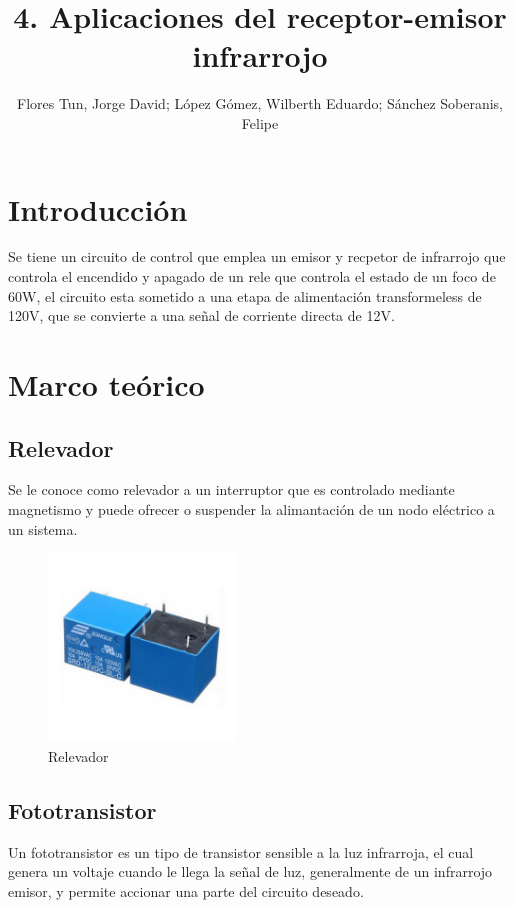 \documentclass[]{article}
\title{4. Aplicaciones del receptor-emisor infrarrojo}
\author{Flores Tun, Jorge David; López Gómez, Wilberth Eduardo; Sánchez Soberanis, Felipe}
\begin{document}
\maketitle

\section{Introducción}

Se tiene un circuito de control que emplea un emisor y recpetor de infrarrojo que controla el encendido y apagado de un rele que controla el estado de un foco de 60W, 
el circuito esta sometido a una etapa de alimentación transformeless de 120V, que se convierte a una señal de corriente directa de 12V.

\section{Marco teórico}

 \subsection{Relevador}

 Se le conoce como relevador a un interruptor que es controlado mediante magnetismo y puede ofrecer o suspender la alimantación de un nodo eléctrico a un sistema.

 \begin{figure}[htb]
     \centering
     \includegraphics[width=5cm]{build/Imagenes/Rele-12V.jpg}
     \caption{Relevador}
 \end{figure}

\subsection{Fototransistor}

Un fototransistor es un tipo de transistor sensible a la luz infrarroja, el cual genera un voltaje cuando le llega la señal de luz, generalmente de un infrarrojo emisor, 
y permite accionar una parte del circuito deseado.
\end{document}
